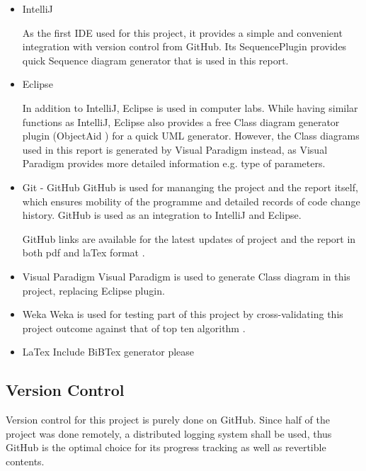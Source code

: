 \begin{itemize}
	\item{IntelliJ} \cite{intellij}
	
	As the first IDE used for this project, it provides a simple and convenient integration with version control from GitHub. Its SequencePlugin \cite{sequenceplugin} provides quick Sequence diagram generator that is used in this report. 
	
	\item{Eclipse} \cite{eclipse}
	
	In addition to IntelliJ, Eclipse is used in computer labs. While having similar functions as IntelliJ, Eclipse also provides a free Class diagram generator plugin (ObjectAid \cite{objectaid}) for a quick UML generator. However, the Class diagrams used in this report is generated by Visual Paradigm instead, as Visual Paradigm provides more detailed information e.g. type of parameters. 
		
	\item{Git - GitHub} \cite{github}
	GitHub is used for mananging the project and the report itself, which ensures mobility of the programme and detailed records of code change history. GitHub is used as an integration to IntelliJ and Eclipse.
	
	GitHub links are available for the latest updates of project \cite{githubproject} and the report in both pdf and laTex format \cite{githubreport}.
	
	\item{Visual Paradigm} \cite{visualparadigm}
	Visual Paradigm is used to generate Class diagram in this project, replacing Eclipse plugin.
		
	\item{Weka} \cite{Hall:2009:WDM:1656274.1656278}
	Weka is used for testing part of this project by cross-validating this project outcome against that of top ten algorithm \cite{Wu2008}. 
		
	\item{LaTex}
	Include BiBTex generator please

\end{itemize}

\subsection{Version Control}
	Version control for this project is purely done on GitHub. Since half of the project was done remotely, a distributed logging system shall be used, thus GitHub is the optimal choice for its progress tracking as well as revertible contents.
	





